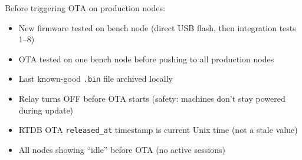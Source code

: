 Before triggering OTA on production nodes:
\begin{itemize}[leftmargin=1.5em]
    \item[ ] New firmware tested on bench node (direct USB flash, then integration tests 1--8)
    \item[ ] OTA tested on one bench node before pushing to all production nodes
    \item[ ] Last known-good \texttt{.bin} file archived locally
    \item[ ] Relay turns OFF before OTA starts (safety: machines don't stay powered during update)
    \item[ ] RTDB OTA \texttt{released\_at} timestamp is current Unix time (not a stale value)
    \item[ ] All nodes showing ``idle'' before OTA (no active sessions)
\end{itemize}
